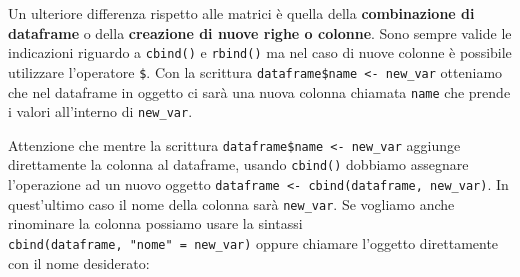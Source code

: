 \documentclass[
]{book}
\newenvironment{Shaded}{\begin{snugshade}}{\end{snugshade}}
\newcommand{\CommentTok}[1]{\textcolor[rgb]{0.56,0.35,0.01}{\textit{#1}}}
\newcommand{\DecValTok}[1]{\textcolor[rgb]{0.00,0.00,0.81}{#1}}
\newcommand{\KeywordTok}[1]{\textcolor[rgb]{0.13,0.29,0.53}{\textbf{#1}}}
\newcommand{\NormalTok}[1]{#1}
\newcommand{\OperatorTok}[1]{\textcolor[rgb]{0.81,0.36,0.00}{\textbf{#1}}}
\newcommand{\StringTok}[1]{\textcolor[rgb]{0.31,0.60,0.02}{#1}}
\begin{document}
Un ulteriore differenza rispetto alle matrici è quella della \textbf{combinazione di dataframe} o della \textbf{creazione di nuove righe o colonne}. Sono sempre valide le indicazioni riguardo a \texttt{cbind()} e \texttt{rbind()} ma nel caso di nuove colonne è possibile utilizzare l'operatore \texttt{\$}. Con la scrittura \texttt{dataframe\$name\ \textless{}-\ new\_var} otteniamo che nel dataframe in oggetto ci sarà una nuova colonna chiamata \texttt{name} che prende i valori all'interno di \texttt{new\_var}.

Attenzione che mentre la scrittura \texttt{dataframe\$name\ \textless{}-\ new\_var} aggiunge direttamente la colonna al dataframe, usando \texttt{cbind()} dobbiamo assegnare l'operazione ad un nuovo oggetto \texttt{dataframe\ \textless{}-\ cbind(dataframe,\ new\_var)}. In quest'ultimo caso il nome della colonna sarà \texttt{new\_var}. Se vogliamo anche rinominare la colonna possiamo usare la sintassi \texttt{cbind(dataframe,\ "nome"\ =\ new\_var)} oppure chiamare l'oggetto direttamente con il nome desiderato:

\begin{Shaded}
\end{Shaded}
\end{document}

